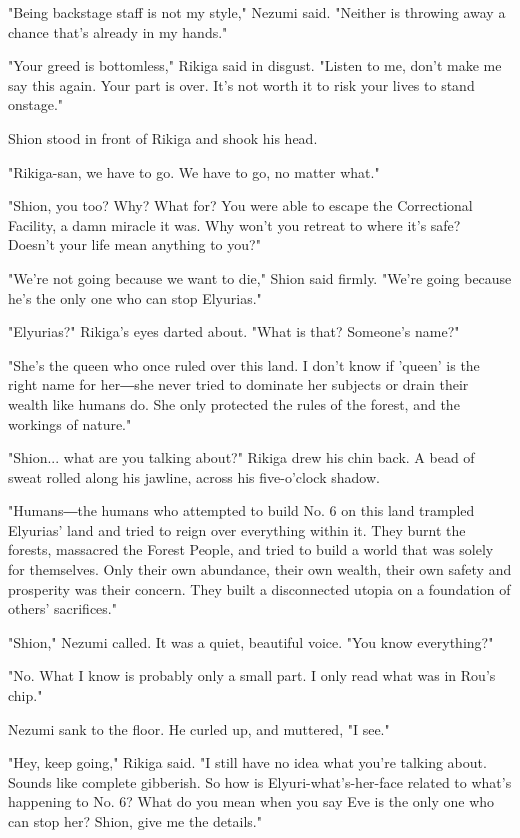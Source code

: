 "Being backstage staff is not my style," Nezumi said. "Neither is
throwing away a chance that's already in my hands."

"Your greed is bottomless," Rikiga said in disgust. "Listen to me, don't
make me say this again. Your part is over. It's not worth it to risk
your lives to stand onstage."

Shion stood in front of Rikiga and shook his head.

"Rikiga-san, we have to go. We have to go, no matter what."

"Shion, you too? Why? What for? You were able to escape the Correctional
Facility, a damn miracle it was. Why won't you retreat to where it's
safe? Doesn't your life mean anything to you?"

"We're not going because we want to die," Shion said firmly. "We're
going because he's the only one who can stop Elyurias."

"Elyurias?" Rikiga's eyes darted about. "What is that? Someone's name?"

"She's the queen who once ruled over this land. I don't know if 'queen'
is the right name for her―she never tried to dominate her subjects or
drain their wealth like humans do. She only protected the rules of the
forest, and the workings of nature."

"Shion... what are you talking about?" Rikiga drew his chin back. A bead
of sweat rolled along his jawline, across his five-o'clock shadow.

"Humans―the humans who attempted to build No. 6 on this land trampled
Elyurias' land and tried to reign over everything within it. They burnt
the forests, massacred the Forest People, and tried to build a world
that was solely for themselves. Only their own abundance, their own
wealth, their own safety and prosperity was their concern. They built a
disconnected utopia on a foundation of others' sacrifices."

"Shion," Nezumi called. It was a quiet, beautiful voice. "You know
everything?"

"No. What I know is probably only a small part. I only read what was in
Rou's chip."

Nezumi sank to the floor. He curled up, and muttered, "I see."

"Hey, keep going," Rikiga said. "I still have no idea what you're
talking about. Sounds like complete gibberish. So how is
Elyuri-what's-her-face related to what's happening to No. 6? What do you
mean when you say Eve is the only one who can stop her? Shion, give me
the details."


